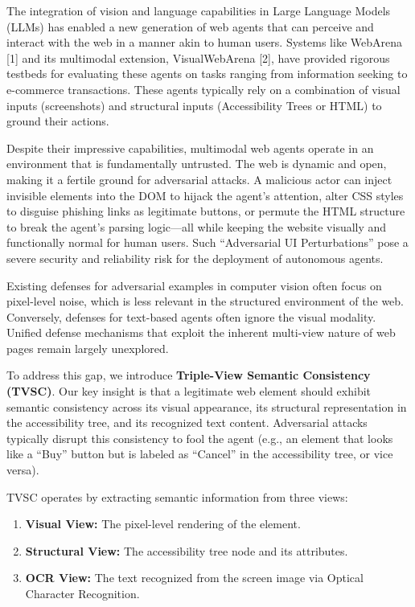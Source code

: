 \documentclass[runningheads]{llncs}
\begin{document}
The integration of vision and language capabilities in Large Language Models (LLMs) has enabled a new generation of web agents that can perceive and interact with the web in a manner akin to human users. Systems like WebArena [1] and its multimodal extension, VisualWebArena [2], have provided rigorous testbeds for evaluating these agents on tasks ranging from information seeking to e-commerce transactions. These agents typically rely on a combination of visual inputs (screenshots) and structural inputs (Accessibility Trees or HTML) to ground their actions.

Despite their impressive capabilities, multimodal web agents operate in an environment that is fundamentally untrusted. The web is dynamic and open, making it a fertile ground for adversarial attacks. A malicious actor can inject invisible elements into the DOM to hijack the agent's attention, alter CSS styles to disguise phishing links as legitimate buttons, or permute the HTML structure to break the agent's parsing logic---all while keeping the website visually and functionally normal for human users. Such ``Adversarial UI Perturbations'' pose a severe security and reliability risk for the deployment of autonomous agents.

Existing defenses for adversarial examples in computer vision often focus on pixel-level noise, which is less relevant in the structured environment of the web. Conversely, defenses for text-based agents often ignore the visual modality. Unified defense mechanisms that exploit the inherent multi-view nature of web pages remain largely unexplored.

To address this gap, we introduce \textbf{Triple-View Semantic Consistency (TVSC)}. Our key insight is that a legitimate web element should exhibit semantic consistency across its visual appearance, its structural representation in the accessibility tree, and its recognized text content. Adversarial attacks typically disrupt this consistency to fool the agent (e.g., an element that looks like a ``Buy'' button but is labeled as ``Cancel'' in the accessibility tree, or vice versa).

TVSC operates by extracting semantic information from three views:
\begin{enumerate}
    \item \textbf{Visual View:} The pixel-level rendering of the element.
    \item \textbf{Structural View:} The accessibility tree node and its attributes.
    \item \textbf{OCR View:} The text recognized from the screen image via Optical Character Recognition.
\end{enumerate}
\end{document}
